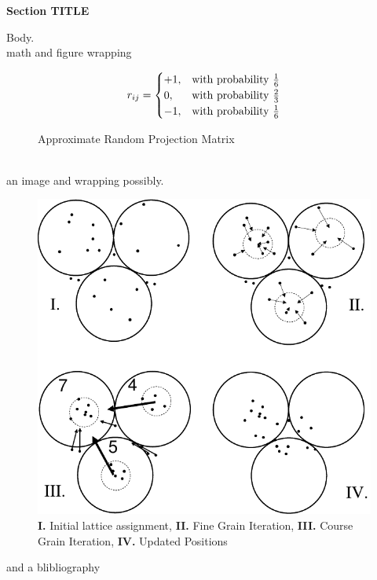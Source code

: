 \documentclass[a4paper,11pt]{article}
\title{}
\author{}
\begin{document}
\begin{center}
\textbf{Section TITLE}\\
\end{center}
Body\cite{Carreira}.
\\
math and figure wrapping
\begin{figure}
\[
    r_{ij}= 
\begin{cases}
    +1, & \text{with probability } {1 \over 6}\\
     0, & \text{with probability } {2 \over 3}\\
    -1, & \text{with probability } {1 \over 6}\\
\end{cases}
\]\caption*{ Approximate Random Projection Matrix\cite{Bingham}}
\end{figure}
\\
an image and wrapping possibly.
\begin{figure}
\centering
\includegraphics[scale=.6]{Diagram1.pdf}
\caption*{ \textbf{I.} Initial lattice assignment, \textbf{II.} Fine Grain
Iteration, \textbf{III.} Course Grain Iteration, \textbf{IV.} Updated Positions}
\end{figure}
and a blibliography


 \markright{ }
\end{document}
